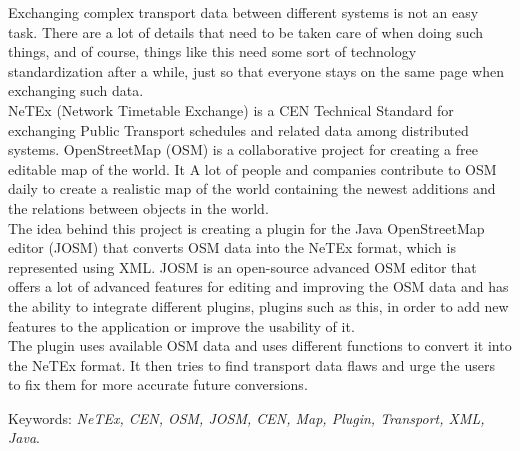 Exchanging complex transport data between different systems is not an easy task. There are a lot of details that need to be taken care of when doing such things, and of course, things like this need some sort of technology standardization after a while, just so that everyone stays on the same page when exchanging such data.\\
\newline
NeTEx (Network Timetable Exchange) is a CEN Technical Standard for exchanging Public Transport schedules and related data among distributed systems. OpenStreetMap (OSM) is a collaborative project for creating a free editable map of the world. It A lot of people and companies contribute to OSM daily to create a realistic map of the world containing the newest additions and the relations between objects in the world.\\
\newline
The idea behind this project is creating a plugin for the Java OpenStreetMap editor (JOSM) that converts OSM data into the NeTEx format, which is represented using XML. JOSM is an open-source advanced OSM editor that offers a lot of advanced features for editing and improving the OSM data and has the ability to integrate different plugins, plugins such as this, in order to add new features to the application or improve the usability of it.\\
\newline
The plugin uses available OSM data and uses different functions to convert it into the NeTEx format. It then tries to find transport data flaws and urge the users to fix them for more accurate future conversions.\\
\newline

Keywords: \textit{NeTEx, CEN, OSM, JOSM, CEN, Map, Plugin, Transport, XML, Java}.